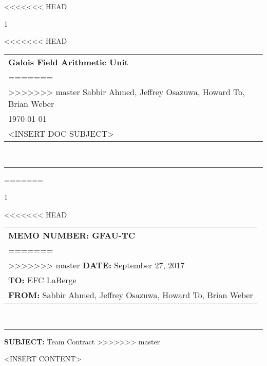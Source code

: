 \documentclass[paper=usletter, fontsize=12pt]{article}
\newcommand{\team}{Galois Field Arithmetic Unit}
\newcommand{\Sabbir}{Sabbir Ahmed}
\newcommand{\Jeffrey}{Jeffrey Osazuwa}
\newcommand{\Howard}{Howard To}
\newcommand{\Brian}{Brian Weber}
\newcommand{\documentinfo}[4]{
    \begin{centering}
        \parbox{2in}{
        \begin{spacing}{1}
            \begin{flushleft}
<<<<<<< HEAD
                \begin{tabular}{l}
                    \large\textbf{#1} \\
=======
                \begin{tabular}{l l}
                    #1 \\
>>>>>>> master
                    #2 \\
                    #3 \\
                    #4 \\
                \end{tabular}\\
                \rule{\textwidth}{1pt}
            \end{flushleft}
        \end{spacing}
        }
    \end{centering}
}
\begin{document}
<<<<<<< HEAD
    \documentinfo{\team~}{\Sabbir, \Jeffrey, \Howard, \Brian}{\today}{<INSERT DOC SUBJECT>}
=======
 \documentinfo{\textbf{MEMO NUMBER:} GFAU-TC}{\textbf{DATE:}  {September 27, 2017}}{\textbf{TO: } EFC LaBerge}{\textbf{FROM: }\Sabbir, \Jeffrey, \Howard, \Brian}{\textbf{SUBJECT: } Team Contract}
>>>>>>> master
    \vspace{-0.3in}

    <INSERT CONTENT>
\end{document}
